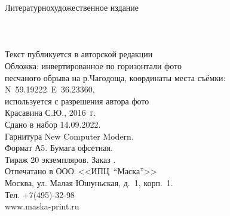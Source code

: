 {
\newpage
\thispagestyle{empty}
\begin{center}
{\small Литературно\sdash художественное издание}\\
\vspace{1.6cm}
{\Large \MyVarAuthorName}\\
\vspace{1.6cm}
{\Large\textbf\MyVarBookName}\\
\vspace{0.4cm}
{\Large\textbf\MyVarBookNamesec}\\
\vspace{1.0cm}
{\small%
Текст публикуется в авторской редакции\\
\vspace{1.0cm}
Обложка: инвертированное по горизонтали фото\\
песчаного обрыва на р.Чагодоща, координаты места съёмки:\\N~59.19222\degree~E~36.23360\degree,\\используется с разрешения автора фото\mdash \\ Красавина С.Ю., 2016~г.\\
\vspace{1.5cm}
Сдано в набор 14.09.2022.\\
Гарнитура New Computer Modern.\\
Формат А5. Бумага офсетная.\\
Тираж 20 экземпляров. Заказ .\\
\vspace{1.0cm}
Отпечатано в ООО~<<ИПЦ~"`Маска"'>>\\
Москва, ул. Малая Юшуньская, д.~1, корп.~1.\\
Тел. +7\thinspace (495)-32-98\\
www.maska-print.ru
}
\end{center}
}
